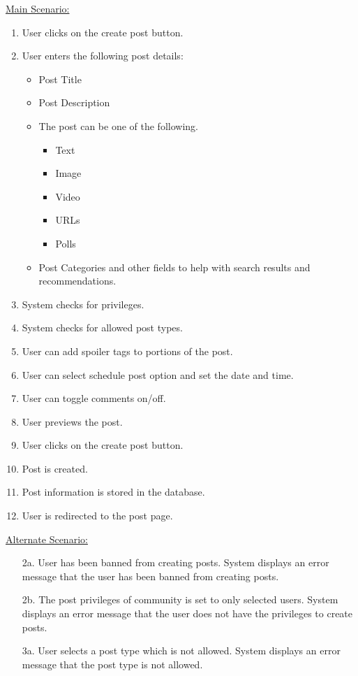 \documentclass[conference,compsoc]{IEEEtran}
\begin{document}
\underline{Main Scenario:}\\
\begin{enumerate}
    \item User clicks on the create post button.
    \item User enters the following post details:
          \begin{itemize}
              \item Post Title
              \item Post Description
              \item The post can be one of the following.
                    \begin{itemize}
                        \item Text
                        \item Image
                        \item Video
                        \item URLs
                        \item Polls
                    \end{itemize}
              \item Post Categories and other fields to help with search results and recommendations.
          \end{itemize}
    \item System checks for privileges.
    \item System checks for allowed post types.
    \item User can add spoiler tags to portions of the post.
    \item User can select schedule post option and set the date and time.
    \item User can toggle comments on/off.
    \item User previews the post.
    \item User clicks on the create post button.
    \item Post is created.
    \item Post information is stored in the database.
    \item User is redirected to the post page.
\end{enumerate}

\underline{Alternate Scenario:}\\
\begin{enumerate}
    \item [2a.] User has been banned from creating posts. System displays an error message that the user has been banned from creating posts.
    \item [2b.] The post privileges of community is set to only selected users. System displays an error message that the user does not have the privileges to create posts.
    \item [3a.] User selects a post type which is not allowed. System displays an error message that the post type is not allowed.
\end{enumerate}\vspace{0.2cm}
\end{document}
